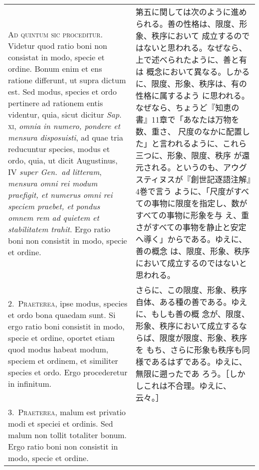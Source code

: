 \documentclass[10pt]{jsarticle}
\begin{document}
\begin{longtable}{p{21em}p{21em}}


{\huge A}{\scshape d quintum sic proceditur}. Videtur quod ratio boni
 non consistat in modo, specie et ordine. Bonum enim et ens ratione
 differunt, ut supra dictum est. Sed modus, species et ordo pertinere ad
 rationem entis videntur, quia, sicut dicitur {\itshape Sap}.~{\scshape
 xi}, {\itshape omnia in numero, pondere et mensura disposuisti}, ad
 quae tria reducuntur species, modus et ordo, quia, ut dicit Augustinus,
 IV {\itshape super Gen.~ad litteram}, {\itshape mensura omni rei modum
 praefigit, et numerus omni rei speciem praebet, et pondus omnem rem ad
 quietem et stabilitatem trahit}. Ergo ratio boni non consistit in modo,
 specie et ordine.

&


第五に関しては次のように進められる。善の性格は、限度、形象、秩序において
 成立するのではないと思われる。なぜなら、上で述べられたように、善と有は
 概念において異なる。しかるに、限度、形象、秩序は、有の性格に属するよう
 に思われる。なぜなら、ちょうど『知恵の書』11章で「あなたは万物を数、重さ、
 尺度のなかに配置した」と言われるように、これら三つに、形象、限度、秩序
 が還元される。というのも、アウグスティヌスが『創世記逐語注解』4巻で言う
 ように、「尺度がすべての事物に限度を指定し、数がすべての事物に形象を与
 え、重さがすべての事物を静止と安定へ導く」からである。ゆえに、善の概念
 は、限度、形象、秩序において成立するのではないと思われる。

\\


2.~{\scshape Praeterea}, ipse modus, species et ordo bona quaedam sunt. Si ergo
 ratio boni consistit in modo, specie et ordine, oportet etiam quod
 modus habeat modum, speciem et ordinem, et similiter species et
 ordo. Ergo procederetur in infinitum.

&


さらに、この限度、形象、秩序自体、ある種の善である。ゆえに、もしも善の概
 念が、限度、形象、秩序において成立するならば、限度が限度、形象、秩序を
 もち、さらに形象も秩序も同様であるはずである。ゆえに、無限に遡ったであ
 ろう。［しかしこれは不合理。ゆえに、云々。］


\\

3.~{\scshape Praeterea}, malum est privatio modi et speciei et ordinis. Sed
 malum non tollit totaliter bonum. Ergo ratio boni non consistit in
 modo, specie et ordine.

&


\end{longtable}
\end{document}
